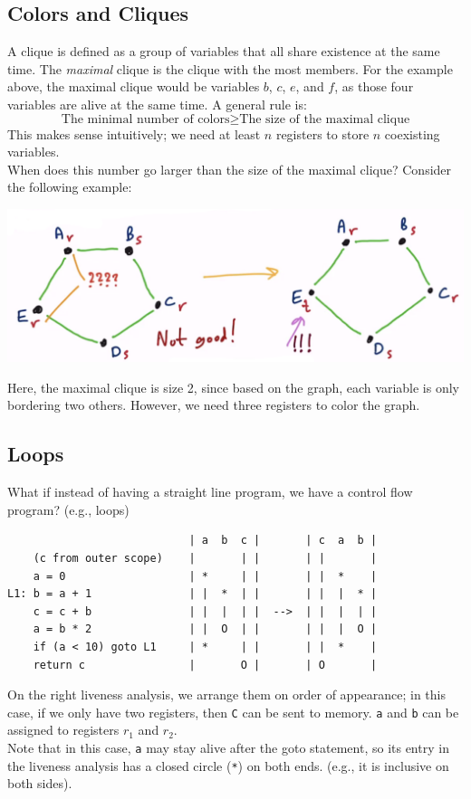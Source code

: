 \documentclass[10pt]{article}
\begin{document}
\subsection*{Colors and Cliques}
A clique is defined as a group of variables that all share existence at the same time.  The \textit{maximal} clique is the clique with the most members.  For the example above, the maximal clique would be variables $b$, $c$, $e$, and $f$, as those four variables are alive at the same time.
A general rule is:
\[\text{The minimal number of colors} \geq \text{The size of the maximal clique}\]
This makes sense intuitively; we need at least $n$ registers to store $n$ coexisting variables.\\
When does this number go larger than the size of the maximal clique?  Consider the following example:
\begin{center}
    \includegraphics*[scale=0.5]{W6_3.png}
\end{center}
Here, the maximal clique is size 2, since based on the graph, each variable is only bordering two others.  However, we need three registers to color the graph.

\subsection*{Loops}
What if instead of having a straight line program, we have a control flow program?  (e.g., loops)

\begin{verbatim}
                            | a  b  c |       | c  a  b |
    (c from outer scope)    |       | |       | |       |
    a = 0                   | *     | |       | |  *    |
L1: b = a + 1               | |  *  | |       | |  |  * |
    c = c + b               | |  |  | |  -->  | |  |  | |
    a = b * 2               | |  O  | |       | |  |  O |
    if (a < 10) goto L1     | *     | |       | |  *    |
    return c                |       O |       | O       |
\end{verbatim}
On the right liveness analysis, we arrange them on order of appearance; in this case, if we only have two registers, then \texttt{C} can be sent to memory.  \texttt{a} and \texttt{b} can be assigned to registers $r_1$ and $r_2$.\\
Note that in this case, \texttt{a} may stay alive after the goto statement, so its entry in the liveness analysis has a closed circle (\texttt{*}) on both ends.  (e.g., it is inclusive on both sides).
\end{document}
